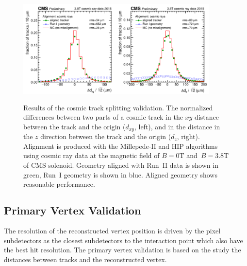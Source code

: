 \begin{figure}[htb]
    \begin{center}
        \includegraphics[width=0.45\textwidth]{../figs/Alignment/AlRes_CRAFT_hist_Delta_dxy.png}\includegraphics[width=0.45\textwidth]{../figs/Alignment/AlRes_CRAFT_hist_Delta_dz.png}
    \end{center}
    \caption{Results of the cosmic track splitting validation. The normalized differences between two parts of a cosmic track in the $xy$ distance between the track and the origin ($d_{xy}$, left), and in the distance in the $z$ direction between the track and the origin ($d_z$, right). Alignment is produced with the Millepede-II and HIP algorithms using cosmic ray data at the magnetic field of $B=$0T and~$B=$3.8T of CMS solenoid. Geometry aligned with Run~II data is shown in green, Run~I geometry is shown in blue. Aligned geometry shows reasonable performance.}
    \label{fig:trackSplit}
\end{figure}

\clearpage

\subsection{Primary Vertex Validation}
\label{sec:AlRes_PVvalid}

The resolution of the reconstructed vertex position is driven by the pixel subdetectors as the closest subdetectors to the interaction point which also have the best hit resolution. The primary vertex validation is based on the study the distances between tracks and the reconstructed vertex. 

